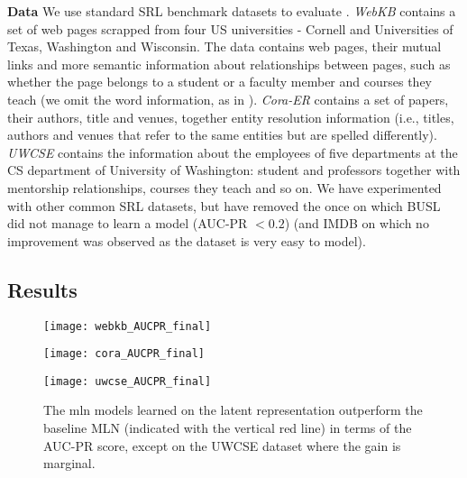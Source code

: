 \textbf{Data}
We use standard SRL benchmark datasets to evaluate .
\textit{WebKB} contains a set of web pages scrapped from four US universities - Cornell and Universities of Texas, Washington and Wisconsin.
The data contains web pages, their mutual links and more semantic information about relationships between pages, such as whether the page belongs to a student or a faculty member and courses they teach (we omit the word information, as in \cite{mihalkova:icml07}).
\textit{Cora-ER} contains a set of papers, their authors, title and venues, together entity resolution information (i.e., titles, authors and venues that refer to the same entities but are spelled differently).
\textit{UWCSE} contains the information about the employees of five departments at the CS department of University of Washington: student and professors together with mentorship relationships, courses they teach and so on.
We have experimented with other common SRL datasets, but have removed the once on which BUSL did not manage to learn a model (AUC-PR $< 0.2$) (and IMDB on which no improvement was observed as the dataset is very easy to model).








\subsection{Results}



\begin{figure}
	\centering
    \begin{minipage}[thb]{.32\linewidth}
        \centering
        \texttt{[image: webkb\_AUCPR\_final]}
    \end{minipage}
    \begin{minipage}[htb]{.32\linewidth}
        \centering
        \texttt{[image: cora\_AUCPR\_final]}
    \end{minipage}
    \begin{minipage}[htb]{.32\linewidth}
        \centering
        \texttt{[image: uwcse\_AUCPR\_final]}
    \end{minipage}
    \caption[Performance of the \gls{mln} models learned on the original and -induced data representations.]{The \gls{mln} models learned on the latent representation outperform the baseline MLN (indicated with the vertical red line) in terms of the AUC-PR score, except on the UWCSE dataset where the gain is marginal.}
    \label{fig:resultsAUCPR}
\end{figure}





